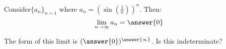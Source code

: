 \documentclass{ximera}
\author{Jim Talamo}
\begin{document}
\begin{exercise}


Consider$\{a_n \}_{n=1}$ where $a_n = \left(\sin\left(\frac{1}{n}\right)\right)^{n}$.  Then:
\[
\lim_{n \to \infty} a_n = \answer{0}
\]

\begin{hint}
The form of this limit is $(\answer{0})^{\answer{\infty}}$.  Is this indeterminate?
\end{hint}
\end{exercise}
\end{document}
